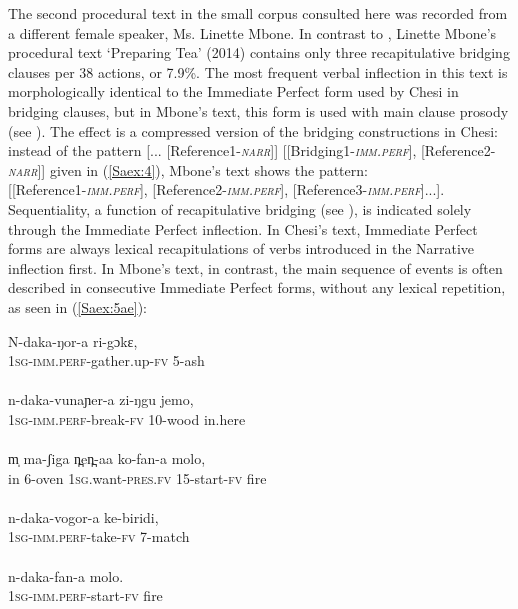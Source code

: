 \documentclass[output=paper]{LSP/langsci}
\begin{document}
The second procedural text in the small corpus consulted here was recorded from a different female speaker, Ms. Linette Mbone. In contrast to \citet{Chesi2014}, Linette Mbone’s procedural text `Preparing Tea' (2014) contains only three recapitulative bridging clauses per 38 actions, or 7.9\%. The most frequent verbal inflection in this text is morphologically identical to the Immediate Perfect form used by Chesi in bridging clauses, but in Mbone’s text, this form is used with main clause prosody (see ). The effect is a compressed version of the bridging constructions in Chesi: instead of the pattern [... [Reference1-\textit{\textsc{narr}}]] [[Bridging1-\textit{\textsc{imm.perf}}], [Reference2-\textit{\textsc{narr}}]] given in (\ref{Saex:4}), Mbone’s text shows the pattern:\\ 
{[[Reference1-\textit{\textsc{imm.perf}}], [Reference2-\textit{\textsc{imm.perf}}], [Reference3-\textit{\textsc{imm.perf}}]...]}. Sequentiality, a function of recapitulative bridging (see ), is indicated solely through the Immediate Perfect inflection. In Chesi’s text, Immediate Perfect forms are always lexical recapitulations of verbs introduced in the Narrative inflection first. In Mbone’s text, in contrast, the main sequence of events is often described in consecutive Immediate Perfect forms, without any lexical repetition, as seen in (\ref{Saex:5ae}):


\begin{exe}
\ex \label{Saex:5ae}
\begin{xlist}
\ex \label{Saex:5a}
\gll N-daka-ŋor-a       ri-gɔkɛ,\\
\textsc{1sg-imm.perf}-gather.up-\textsc{fv}  5-ash\\
\glt {}\\
\ex \label{Saex:5b}
\gll n-daka-vunaɲer-a     zi-ŋgu     jemo,\\
\textsc{1sg-imm.perf-}break-\textsc{fv}  10-wood  in.here\\
\glt {}\\
\ex \label{Saex:5c}
\gll m̩   ma-ʃiga   n̪en̪-aa       ko-fan-a   molo,\\
in  6-oven    \textsc{1sg.}want-\textsc{pres.fv}  15-start-\textsc{fv}  fire\\
\glt {}\\
\ex \label{Saex:5d}
\gll n-daka-vogor-a   ke-biridi,\\     	       
   \textsc{1sg-imm.perf-}take-\textsc{fv}  7-match\\
\glt {} \\
\ex \label{Saex:5e}
\gll n-daka-fan-a       molo.\\     	       
    \textsc{1sg-imm.perf-}start-\textsc{fv}  fire\\
\glt {} 
\end{xlist}
\end{exe}
\end{document}

